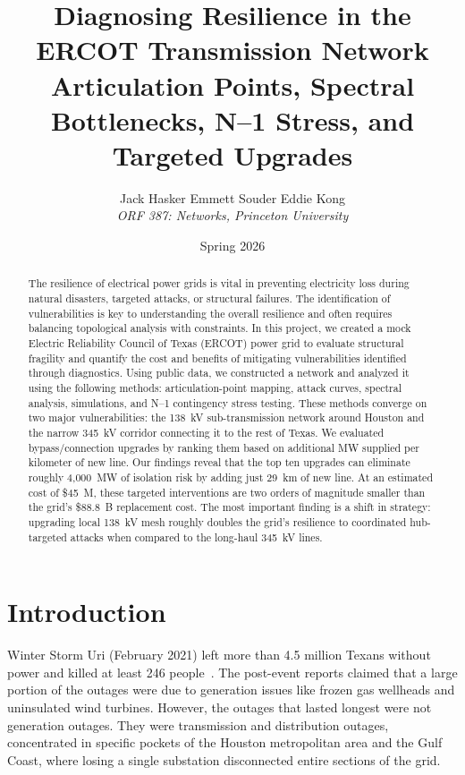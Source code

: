 \documentclass[12pt,letterpaper]{article}
\title{\textbf{Diagnosing Resilience in the ERCOT Transmission Network}\\[0.4em]
\large Articulation Points, Spectral Bottlenecks, N--1 Stress, and Targeted Upgrades}
\author{
    Jack Hasker \quad Emmett Souder \quad Eddie Kong\\[0.3em]
    \textit{ORF 387: Networks, Princeton University}\\[0.3em]
}
\date{Spring 2026}
\begin{document}
\maketitle
\thispagestyle{empty}

\begin{abstract}
The resilience of electrical power grids is vital in preventing electricity loss during natural disasters, targeted attacks, or structural failures. The identification of vulnerabilities is key to understanding the overall resilience and often requires balancing topological analysis with constraints. In this project, we created a mock Electric Reliability Council of Texas (ERCOT) power grid to evaluate structural fragility and quantify the cost and benefits of mitigating vulnerabilities identified through diagnostics. Using public data, we constructed a network and analyzed it using the following methods: articulation-point mapping, attack curves, spectral analysis, simulations, and N--1 contingency stress testing. These methods converge on two major vulnerabilities: the 138~kV sub-transmission network around Houston and the narrow 345~kV corridor connecting it to the rest of Texas. We evaluated bypass/connection upgrades by ranking them based on additional MW supplied per kilometer of new line. Our findings reveal that the top ten upgrades can eliminate roughly 4{,}000~MW of isolation risk by adding just 29~km of new line. At an estimated cost of \$45~M, these targeted interventions are two orders of magnitude smaller than the grid's \$88.8~B replacement cost. The most important finding is a shift in strategy: upgrading local 138~kV mesh roughly doubles the grid's resilience to coordinated hub-targeted attacks when compared to the long-haul 345~kV lines.
\end{abstract}

\newpage
\tableofcontents
\newpage

\section{Introduction}

Winter Storm Uri (February 2021) left more than 4.5 million Texans without power and killed at least 246 people~\cite{uri2021}. The post-event reports claimed that a large portion of the outages were due to generation issues like frozen gas wellheads and uninsulated wind turbines. However, the outages that lasted longest were not generation outages. They were transmission and distribution outages, concentrated in specific pockets of the Houston metropolitan area and the Gulf Coast, where losing a single substation disconnected entire sections of the grid.
\end{document}

